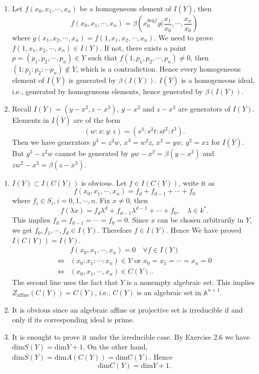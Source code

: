   \begin{solution}
    \begin{enumerate}
      \item  Let $f(x_0,x_1,\cdots,x_n)$ be a homogeneous element of $I(\overline{Y})$, then 
	\[
	  f(x_0,x_1,\cdots,x_n)=\beta\left( x_0^{\mathrm{deg}f}g(\frac{x_1}{x_0},\cdots,\frac{x_n}{x_0} \right) 
	\]
	where $g(x_1,x_2,\cdots,x_n)=f\left( 1,x_1,x_2,\cdots,x_n \right) $. We need to prove $f(1,x_1,x_2,\cdots,x_n)\in I(Y)$. If not, there exists a point $p=(p_1,p_2,\cdots,p_n)\in Y$ such that $f\left( 1,p_1,p_2,\cdots,p_n \right) \neq 0$, then $(1:p_1:p_2:\cdots p_n)\notin \overline{Y}$, which is a contradiction. Hence every homogeneous element of $I(\overline{Y})$ is generated by $\beta\left( I(Y) \right) $. $I(\overline{Y})$ is a homogeneous ideal, i.e., generated by homogeneous elements, hence generated by $\beta\left( I(Y) \right) $.
      \item Recall $I(Y)=(y-x^2,z-x^3)$, $y-x^2$ and $z-x^3$ are generators of $I(Y)$.
	Elements in $I(\overline{Y})$ are of the form 
	 \[
	   (w:x:y:z)=(s^{3}:s^2t:st^2:t^3).
	\] 
	Then we have generators $y^3=z^2w$, $x^3=w^2z$, $x^2=yw$, $y^2=xz$ for $I\left( \overline{Y} \right) $. But $y^3-z^2w$ cannot be generated by $yw-x^2=\beta\left( y-x^2 \right) $ and $zw^2-x^3=\beta\left( z-x^3 \right) $.
    \end{enumerate}
  \end{solution}

  \begin{solution}
    \begin{enumerate}
      \item $I(Y)\subset I\left( C(Y) \right) $ is obvious. Let $f\in I\left( C(Y) \right) $, write it as
	\[
	  f(x_0,x_1,\cdots,x_n)=f_d+f_{d-1}+\cdots+f_0
	\] where $f_i\in S_i,i=0,1,\cdots,n$. Fix $x\neq 0$, then 
	\[
	  f(\lambda x)=f_d \lambda^{d}+f_{d-1}\lambda^{d-1}+\cdots+f_0, \quad \lambda \in k^{*}.
	\]
	This implies $f_d=f_{d-1}=\cdots=f_0=0$. Since $x$ can be chosen arbitrarily in $Y$, we get $f_0,f_1,\cdots,f_d\in I(Y)$. Therefore $f\in I(Y)$. Hence We have proved $I\left( C(Y) \right) =I(Y)$.
\begin{align*}
 & f(x_0,x_1,\cdots,x_n)=0 \quad \forall f \in I(Y)\\
  \Longleftrightarrow & (x_0:x_1:\cdots:x_n)\in Y \text{ or }x_0=x_1=\cdots=x_n=0 \\
  \Longleftrightarrow & (x_0,x_1,\cdots,x_n)\in C(Y).
.\end{align*}
The second line uses the fact that $Y$ is a nonempty algebraic set. This implies $Z_{\mathrm{affine}}(C(Y))=C(Y)$, i.e., $C(Y)$ is an algebraic set in $\mathbb{A}^{n+1}$.
\item It is obvious since an algebraic affine or projective set is irreducible if and only if its corresponding ideal is prime.
\item It is enought to prove it under the irreducible case. By Exercise 2.6 we have $\mathrm{dim}S(Y)=\mathrm{dim}Y+1$. On the other hand, $\mathrm{dim}S(Y)=\mathrm{dim}A(C(Y))=\mathrm{dim}C(Y)$. Hence 
  \[
    \mathrm{dim}C\left( Y \right) =\mathrm{dim}Y+1.
  \] 
    \end{enumerate}
  \end{solution}

